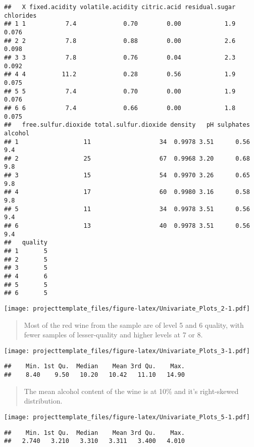 \documentclass[]{article}
\begin{document}
\begin{verbatim}
##   X fixed.acidity volatile.acidity citric.acid residual.sugar chlorides
## 1 1           7.4             0.70        0.00            1.9     0.076
## 2 2           7.8             0.88        0.00            2.6     0.098
## 3 3           7.8             0.76        0.04            2.3     0.092
## 4 4          11.2             0.28        0.56            1.9     0.075
## 5 5           7.4             0.70        0.00            1.9     0.076
## 6 6           7.4             0.66        0.00            1.8     0.075
##   free.sulfur.dioxide total.sulfur.dioxide density   pH sulphates alcohol
## 1                  11                   34  0.9978 3.51      0.56     9.4
## 2                  25                   67  0.9968 3.20      0.68     9.8
## 3                  15                   54  0.9970 3.26      0.65     9.8
## 4                  17                   60  0.9980 3.16      0.58     9.8
## 5                  11                   34  0.9978 3.51      0.56     9.4
## 6                  13                   40  0.9978 3.51      0.56     9.4
##   quality
## 1       5
## 2       5
## 3       5
## 4       6
## 5       5
## 6       5
\end{verbatim}

\texttt{[image: projecttemplate\_files/figure-latex/Univariate\_Plots\_2-1.pdf]}

\begin{quote}
Most of the red wine from the sample are of level 5 and 6 quality, with
fewer samples of lesser-quality and higher levels at 7 or 8.
\end{quote}

\texttt{[image: projecttemplate\_files/figure-latex/Univariate\_Plots\_3-1.pdf]}

\begin{verbatim}
##    Min. 1st Qu.  Median    Mean 3rd Qu.    Max. 
##    8.40    9.50   10.20   10.42   11.10   14.90
\end{verbatim}

\begin{quote}
The mean alcohol content of the wine is at 10\% and it's right-skewed
distribution.
\end{quote}

\texttt{[image: projecttemplate\_files/figure-latex/Univariate\_Plots\_5-1.pdf]}

\begin{verbatim}
##    Min. 1st Qu.  Median    Mean 3rd Qu.    Max. 
##   2.740   3.210   3.310   3.311   3.400   4.010
\end{verbatim}
\end{document}
